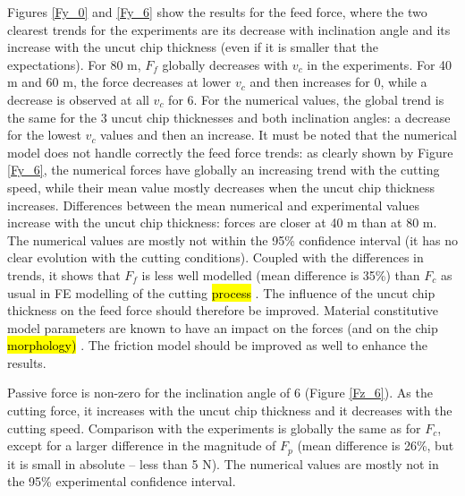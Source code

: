 \documentclass[preprint,12pt,times]{elsarticle}
\begin{document}
Figures \ref{Fy_0} and \ref{Fy_6} show the results for the feed force, where the two clearest trends for the experiments are its decrease with inclination angle and its increase with the uncut chip thickness (even if it is smaller that the expectations). For 80 \textmu{}m, $F_f$ globally decreases with $v_c$ in the experiments. For 40 \textmu{}m and 60 \textmu{}m, the force decreases at lower $v_c$ and then increases for 0\textdegree{}, while a decrease is observed at all $v_c$ for 6\textdegree{}. For the numerical values, the global trend is the same for the 3 uncut chip thicknesses and both inclination angles: a decrease for the lowest $v_c$ values and then an increase. It must be noted that the numerical model does not handle correctly the feed force trends: as clearly shown by Figure \ref{Fy_6}, the numerical forces have globally an increasing trend with the cutting speed, while their mean value mostly decreases when the uncut chip thickness increases. Differences between the mean numerical and experimental values increase with the uncut chip thickness: forces are closer at 40 \textmu{}m than at 80 \textmu{}m. The numerical values are mostly not within the 95\% confidence interval (it has no clear evolution with the cutting conditions). Coupled with the differences in trends, it shows that $F_f$ is less well modelled (mean difference is 35\%) than $F_c$ as usual in FE modelling of the cutting \hl{process} \cite{}. The influence of the uncut chip thickness on the feed force should therefore be improved. Material constitutive model parameters are known to have an impact on the forces (and on the chip \hl{morphology)} \cite{duco}. The friction model should be improved as well to enhance the results.

Passive force is non-zero for the inclination angle of 6\textdegree{} (Figure \ref{Fz_6}). As the cutting force, it increases with the uncut chip thickness and it decreases with the cutting speed. Comparison with the experiments is globally the same as for $F_c$, except for a larger difference in the magnitude of $F_p$ (mean difference is 26\%, but it is small in absolute – less than 5 N). The numerical values are mostly not in the 95\% experimental confidence interval.
\end{document}
